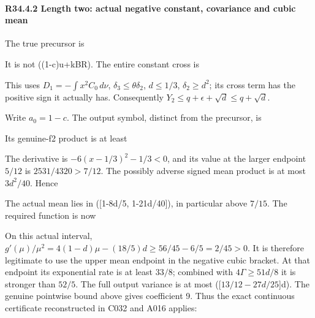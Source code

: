 \paragraph{R34.4.2 Length two: actual negative constant, covariance and cubic mean}

The true precursor is


It is not ((1-c)u+kBR). The entire constant cross is


This uses \(D_1=-\int x^2C_0\,\allowbreak  d\nu\), \(\delta_3\le\theta \delta_2\),
\(d\le1/3\), \(\delta_2\ge d^2\); its cross term has the positive sign it
actually has. Consequently \(Y_2\le q+\epsilon+\sqrt d\le q+\sqrt d\).

Write \(a_0=1-c\). The output symbol, distinct from the precursor, is


Its genuine-f2 product is at least


The derivative is \(-6(x-1/3)^2-1/3<0\), and its value at the larger
endpoint \(5/12\) is \(2531/4320>7/12\). The possibly adverse signed
mean product is at most \(3d^2/40\). Hence


The actual mean lies in ([1-8d/5, 1-21d/40]), in particular above
\(7/15\). The required function is now


On this actual interval,
\(g'(\mu)/\mu^2=4(1-d)\mu-(18/5)d\ge56/45-6/5=2/45>0\).
It is therefore legitimate to use the upper mean endpoint in the
negative cubic bracket. At that endpoint its exponential rate is at least
\(33/8\); combined with \(4\Gamma\ge51d/8\) it is stronger than \(52/5\).
The full output variance is at most ([\(13/12-27d/25\)]d). The genuine
pointwise bound above gives coefficient 9. Thus the exact continuous
certificate reconstructed in C032 and A016 applies:

